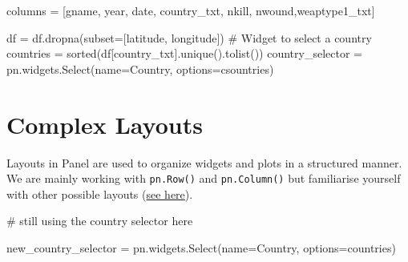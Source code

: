\documentclass[
  letterpaper,
  DIV=11,
  numbers=noendperiod]{scrreprt}
\newenvironment{Shaded}{\begin{snugshade}}{\end{snugshade}}
\newcommand{\BuiltInTok}[1]{\textcolor[rgb]{0.00,0.23,0.31}{#1}}
\newcommand{\CommentTok}[1]{\textcolor[rgb]{0.37,0.37,0.37}{#1}}
\newcommand{\NormalTok}[1]{\textcolor[rgb]{0.00,0.23,0.31}{#1}}
\newcommand{\OperatorTok}[1]{\textcolor[rgb]{0.37,0.37,0.37}{#1}}
\newcommand{\StringTok}[1]{\textcolor[rgb]{0.13,0.47,0.30}{#1}}
\begin{document}
\begin{Shaded}
\begin{Highlighting}[]
\NormalTok{columns }\OperatorTok{=}\NormalTok{ [}\StringTok{\textquotesingle{}gname\textquotesingle{}}\NormalTok{, }\StringTok{\textquotesingle{}year\textquotesingle{}}\NormalTok{, }\StringTok{\textquotesingle{}date\textquotesingle{}}\NormalTok{, }\StringTok{\textquotesingle{}country\_txt\textquotesingle{}}\NormalTok{, }\StringTok{\textquotesingle{}nkill\textquotesingle{}}\NormalTok{, }\StringTok{\textquotesingle{}nwound\textquotesingle{}}\NormalTok{,}\StringTok{\textquotesingle{}weaptype1\_txt\textquotesingle{}}\NormalTok{]}

\NormalTok{df }\OperatorTok{=}\NormalTok{ df.dropna(subset}\OperatorTok{=}\NormalTok{[}\StringTok{\textquotesingle{}latitude\textquotesingle{}}\NormalTok{, }\StringTok{\textquotesingle{}longitude\textquotesingle{}}\NormalTok{])}
\CommentTok{\# Widget to select a country}
\NormalTok{countries }\OperatorTok{=} \BuiltInTok{sorted}\NormalTok{(df[}\StringTok{\textquotesingle{}country\_txt\textquotesingle{}}\NormalTok{].unique().tolist())}
\NormalTok{country\_selector }\OperatorTok{=}\NormalTok{ pn.widgets.Select(name}\OperatorTok{=}\StringTok{\textquotesingle{}Country\textquotesingle{}}\NormalTok{, options}\OperatorTok{=}\NormalTok{csountries)}
\end{Highlighting}
\end{Shaded}

\hypertarget{complex-layouts}{%
\section{Complex Layouts}\label{complex-layouts}}

Layouts in Panel are used to organize widgets and plots in a structured
manner. We are mainly working with \texttt{pn.Row()} and
\texttt{pn.Column()} but familiarise yourself with other possible
layouts
(\href{https://panel.holoviz.org/reference/index.html\#layouts}{see
here}).

\begin{Shaded}
\begin{Highlighting}[]
\CommentTok{\# still using the country selector here}

\NormalTok{new\_country\_selector }\OperatorTok{=}\NormalTok{ pn.widgets.Select(name}\OperatorTok{=}\StringTok{\textquotesingle{}Country\textquotesingle{}}\NormalTok{, options}\OperatorTok{=}\NormalTok{countries)}
\end{Highlighting}
\end{Shaded}
\end{document}
